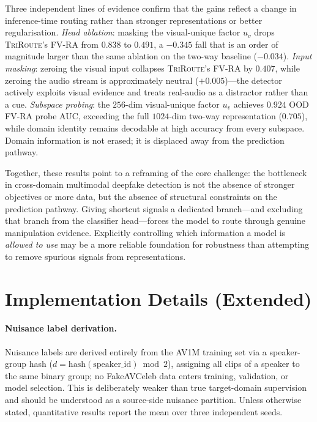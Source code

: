 \documentclass{article}
\newcommand{\method}{\textsc{TriRoute}}
\begin{document}
Three independent lines of evidence confirm that the gains reflect a change in inference-time routing rather than stronger representations or better regularisation. \emph{Head ablation}: masking the visual-unique factor $u_v$ drops \method's FV-RA from $0.838$ to $0.491$, a $-0.345$ fall that is an order of magnitude larger than the same ablation on the two-way baseline ($-0.034$). \emph{Input masking}: zeroing the visual input collapses \method's FV-RA by $0.407$, while zeroing the audio stream is approximately neutral ($+0.005$)---the detector actively exploits visual evidence and treats real-audio as a distractor rather than a cue. \emph{Subspace probing}: the $256$-dim visual-unique factor $u_v$ achieves $0.924$ OOD FV-RA probe AUC, exceeding the full $1024$-dim two-way representation ($0.705$), while domain identity remains decodable at high accuracy from every subspace. Domain information is not erased; it is displaced away from the prediction pathway.

Together, these results point to a reframing of the core challenge: the bottleneck in cross-domain multimodal deepfake detection is not the absence of stronger objectives or more data, but the absence of structural constraints on the prediction pathway. Giving shortcut signals a dedicated branch---and excluding that branch from the classifier head---forces the model to route through genuine manipulation evidence. Explicitly controlling which information a model is \emph{allowed to use} may be a more reliable foundation for robustness than attempting to remove spurious signals from representations.




\newpage
\appendix
\section{Implementation Details (Extended)}
\label{app:implementation_details}

\paragraph{Nuisance label derivation.}
Nuisance labels are derived entirely from the AV1M training set via a speaker-group hash ($d = \mathrm{hash}(\mathrm{speaker\_id})\bmod 2$), assigning all clips of a speaker to the same binary group; no FakeAVCeleb data enters training, validation, or model selection. This is deliberately weaker than true target-domain supervision and should be understood as a source-side nuisance partition. Unless otherwise stated, quantitative results report the mean over three independent seeds.
\end{document}
